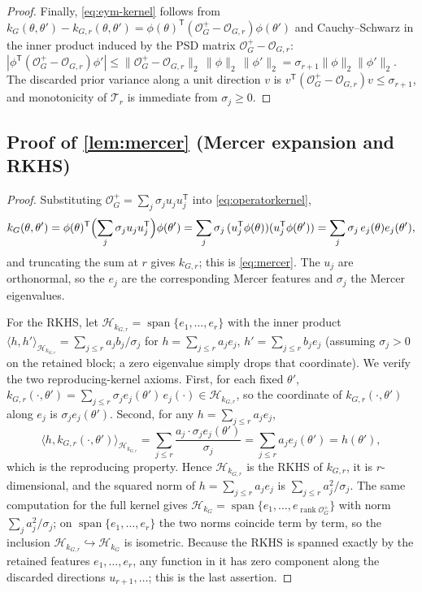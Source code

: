 \documentclass[aps,prxquantum,reprint,amsmath,amssymb,floatfix,nofootinbib,superscriptaddress,longbibliography]{revtex4-2}
\theoremstyle{remark}
\newcommand{\calO}{\mathcal{O}}
\begin{document}
\begin{proof}
Finally, \cref{eq:eym-kernel} follows from
\(k_G(\theta,\theta')-k_{G,r}(\theta,\theta')
=\phi(\theta)^{\mathsf T}(\calO_G^{+}-\calO_{G,r})\phi(\theta')\) and
Cauchy--Schwarz in the inner product induced by the PSD matrix
\(\calO_G^{+}-\calO_{G,r}\):
\(|\phi^{\mathsf T}(\calO_G^{+}-\calO_{G,r})\phi'|
\le \|\calO_G^{+}-\calO_{G,r}\|_2\,\|\phi\|_2\,\|\phi'\|_2
=\sigma_{r+1}\|\phi\|_2\|\phi'\|_2\).  The discarded prior variance along a unit
direction \(v\) is \(v^{\mathsf T}(\calO_G^{+}-\calO_{G,r})v\le\sigma_{r+1}\),
and monotonicity of \(\mathcal T_r\) is immediate from \(\sigma_j\ge0\).
\end{proof}

\subsection{Proof of \texorpdfstring{\cref{lem:mercer}}{Lemma 1} (Mercer
expansion and RKHS)}
\label{app:mercer}

\begin{proof}
Substituting \(\calO_G^{+}=\sum_j\sigma_j u_ju_j^{\mathsf T}\) into
\cref{eq:operatorkernel},
\[
    k_G(\theta,\theta')
    =\phi(\theta)^{\mathsf T}\Bigl(\sum_{j}\sigma_j u_ju_j^{\mathsf T}\Bigr)
    \phi(\theta')
    =\sum_{j}\sigma_j\,(u_j^{\mathsf T}\phi(\theta))(u_j^{\mathsf T}\phi(\theta'))
    =\sum_{j}\sigma_j\,e_j(\theta)e_j(\theta'),
\]
and truncating the sum at \(r\) gives \(k_{G,r}\); this is \cref{eq:mercer}.  The
\(u_j\) are orthonormal, so the \(e_j\) are the corresponding Mercer features and
\(\sigma_j\) the Mercer eigenvalues.

For the RKHS, let \(\mathcal H_{k_{G,r}}=\operatorname{span}\{e_1,\dots,e_r\}\)
with the inner product \(\langle h,h'\rangle_{\mathcal H_{k_{G,r}}}
=\sum_{j\le r}a_jb_j/\sigma_j\) for \(h=\sum_{j\le r}a_je_j\),
\(h'=\sum_{j\le r}b_je_j\) (assuming \(\sigma_j>0\) on the retained block; a zero
eigenvalue simply drops that coordinate).  We verify the two reproducing-kernel
axioms.  First, for each fixed \(\theta'\),
\(k_{G,r}(\cdot,\theta')=\sum_{j\le r}\sigma_j e_j(\theta')\,e_j(\cdot)
\in\mathcal H_{k_{G,r}}\), so the coordinate of
\(k_{G,r}(\cdot,\theta')\) along \(e_j\) is \(\sigma_j e_j(\theta')\).  Second,
for any \(h=\sum_{j\le r}a_je_j\),
\[
    \langle h,k_{G,r}(\cdot,\theta')\rangle_{\mathcal H_{k_{G,r}}}
    =\sum_{j\le r}\frac{a_j\cdot\sigma_j e_j(\theta')}{\sigma_j}
    =\sum_{j\le r}a_j e_j(\theta')=h(\theta'),
\]
which is the reproducing property.  Hence \(\mathcal H_{k_{G,r}}\) is the RKHS of
\(k_{G,r}\), it is \(r\)-dimensional, and the squared norm of
\(h=\sum_{j\le r}a_je_j\) is \(\sum_{j\le r}a_j^2/\sigma_j\).  The same
computation for the full kernel gives \(\mathcal H_{k_G}
=\operatorname{span}\{e_1,\dots,e_{\operatorname{rank}\calO_G^{+}}\}\) with norm
\(\sum_j a_j^2/\sigma_j\); on \(\operatorname{span}\{e_1,\dots,e_r\}\) the two
norms coincide term by term, so the inclusion
\(\mathcal H_{k_{G,r}}\hookrightarrow\mathcal H_{k_G}\) is isometric.  Because the
RKHS is spanned exactly by the retained features \(e_1,\dots,e_r\), any function
in it has zero component along the discarded directions \(u_{r+1},\dots\); this
is the last assertion.
\end{proof}
\end{document}
